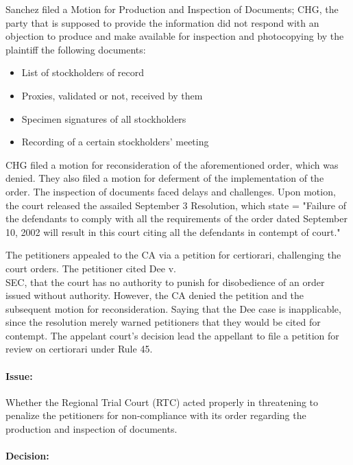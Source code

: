 \documentclass[
12pt,
oneside,
onehalfspacing,
headsepline
]{DigestCollection}
\begin{document}
Sanchez filed a Motion for Production and Inspection of Documents; CHG, the party that is supposed to provide the information did not respond with an objection to produce and make available for inspection and photocopying by the plaintiff the following documents:

\begin{itemize}
  \item  List of stockholders of record
  \item Proxies, validated or not, received by them
  \item Specimen signatures of all stockholders
  \item Recording of a certain stockholders’ meeting
\end{itemize}

CHG filed a motion for reconsideration of the aforementioned order, which was denied. They also filed a motion for deferment of the implementation of the order. The inspection of documents faced delays and challenges. Upon motion, the court released the assailed September 3 Resolution, which state = "Failure of the defendants to comply with all the requirements of the order dated September 10, 2002 will result in this court citing all the defendants in contempt of court."

The petitioners appealed to the CA via a petition for certiorari, challenging the court orders. The petitioner cited Dee v. \\SEC, that the court has no authority to punish for disobedience of an order issued without authority. However, the CA denied the petition and the subsequent motion for reconsideration. Saying that the Dee case is inapplicable, since the resolution merely warned petitioners that they would be cited for contempt. The appelant court's decision lead the appellant to file a petition for review on certiorari under Rule 45.

\paragraph{Issue:}
\label{ee6ee210-0f96-11ef-a737-5534cab7361b}


Whether the Regional Trial Court (RTC) acted properly in threatening to penalize the petitioners for non-compliance with its order regarding the production and inspection of documents.

\paragraph{Decision:}
\label{ec7e83c0-0f96-11ef-a737-5534cab7361b}
\end{document}
